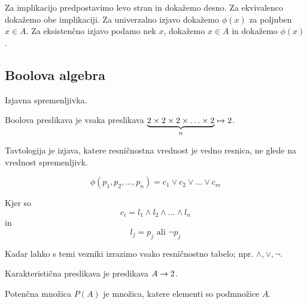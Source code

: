 
Za implikacijo predpostavimo levo stran in dokažemo desno. Za ekvivalenco dokažemo obe implikaciji. Za univerzalno izjavo dokažemo $\phi(x)$ za poljuben $x \in A$. Za eksistenčno izjavo podamo nek $x$, dokažemo $x \in A$ in dokažemo $\phi(x)$.

\subsection{Boolova algebra}


Izjavna spremenljivka.

Boolova preslikava je vsaka preslikava $\underbrace{2 \times 2 \times 2 \times \ldots \times 2}_n \mapsto 2$.

Tavtologija je izjava, katere resničnostna vrednost je vedno resnica, ne glede na vrednost spremenljivk.


\[
	\phi(p_1,p_2,\ldots,p_n) = c_1 \lor c_2 \lor \ldots \lor c_m
\]

Kjer so \[
	c_i = l_1 \land l_2 \land \ldots \land l_n
\]
in \[
	l_j = p_j \text{ ali } \lnot p_j
\]


Kadar lahko s temi vezniki izrazimo vsako resničnostno tabelo; npr. $\land, \lor, \lnot$.


Karakteristična preslikava je preslikava $A \to 2$.

Potenčna množica $P(A)$ je množica, katere elementi so podmnožice $A$.